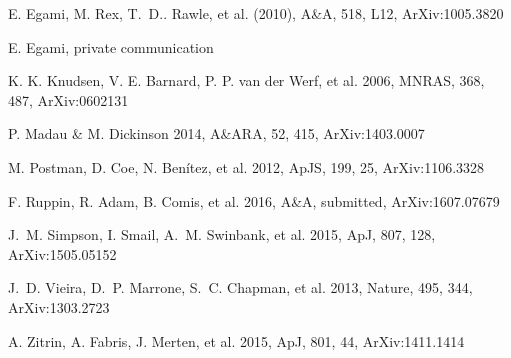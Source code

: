 \documentclass[11pt,a4paper,twoside,graphicx,color]{article}
\begin{document}
\begin{thebibliography}{9}
{
E. Egami, M. Rex, T.~D.. Rawle, et al. (2010), A\&A, 518, L12, ArXiv:1005.3820

E. Egami, private communication

K. K. Knudsen, V. E. Barnard, P. P. van der Werf, et al. 2006, MNRAS, 368, 487, ArXiv:0602131

P. Madau \& M. Dickinson 2014, A\&ARA, 52, 415, ArXiv:1403.0007

M. Postman, D. Coe, N. Ben\'itez, et al. 2012, ApJS, 199, 25, ArXiv:1106.3328

F. Ruppin, R. Adam, B. Comis, et al. 2016, A\&A, submitted, ArXiv:1607.07679

J.~M. Simpson, I. Smail, A.~M. Swinbank, et al. 2015, ApJ, 807, 128, ArXiv:1505.05152

J.~D. Vieira, D.~P. Marrone, S.~C. Chapman, et al. 2013, Nature, 495, 344, ArXiv:1303.2723

A. Zitrin, A. Fabris, J. Merten, et al. 2015, ApJ, 801, 44, ArXiv:1411.1414

}
\end{thebibliography}
\end{document}
